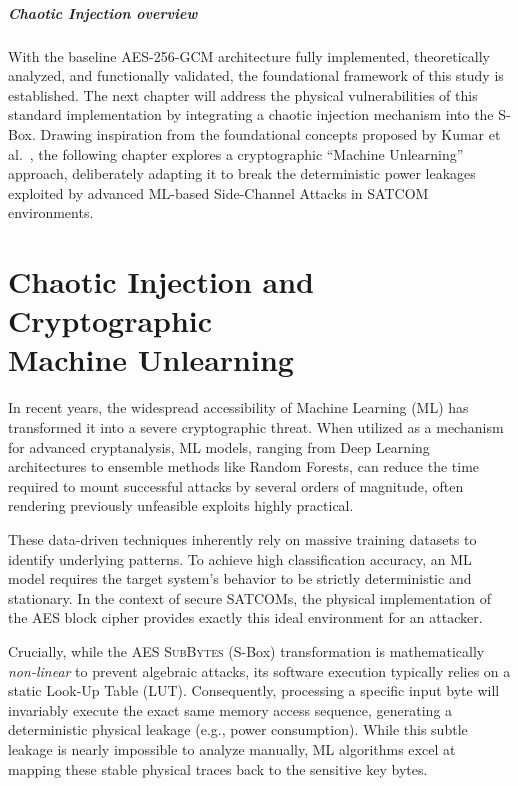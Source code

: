 \documentclass[11pt,a4paper]{report}
\begin{document}
\paragraph{Chaotic Injection overview}
With the baseline AES-256-GCM architecture fully implemented, theoretically analyzed, and functionally validated, the foundational framework of this study is established. 
The next chapter will address the physical vulnerabilities of this standard implementation by integrating a chaotic injection mechanism into the S-Box. 
Drawing inspiration from the foundational concepts proposed by Kumar et al.~\cite{KumarPaper}, the following chapter explores a cryptographic ``Machine Unlearning'' approach, deliberately adapting it to break the deterministic power leakages exploited by advanced ML-based Side-Channel Attacks in SATCOM environments.



\chapter[Chaotic Injection and Cryptographic Machine Unlearning]{Chaotic Injection and Cryptographic \\ Machine Unlearning}
In recent years, the widespread accessibility of Machine Learning (ML) has transformed it into a severe cryptographic threat. 
When utilized as a mechanism for advanced cryptanalysis, ML models, ranging from Deep Learning architectures to ensemble methods like Random Forests, 
can reduce the time required to mount successful attacks by several orders of magnitude, often rendering previously unfeasible exploits highly practical.

These data-driven techniques inherently rely on massive training datasets to identify underlying patterns. 
To achieve high classification accuracy, an ML model requires the target system's behavior to be strictly deterministic and stationary. 
In the context of secure SATCOMs, the physical implementation of the AES block cipher provides exactly this ideal environment for an attacker.

Crucially, while the AES \textsc{SubBytes} (S-Box) transformation is mathematically \textit{non-linear} to prevent algebraic attacks, its software execution typically relies on a static Look-Up Table (LUT). 
Consequently, processing a specific input byte will invariably execute the exact same memory access sequence, generating a deterministic physical leakage (e.g., power consumption). 
While this subtle leakage is nearly impossible to analyze manually, ML algorithms excel at mapping these stable physical traces back to the sensitive key bytes.
\end{document}

